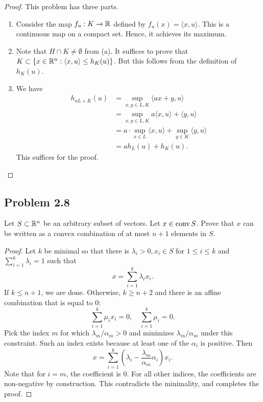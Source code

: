 \documentclass[12pt]{article}
\begin{document}
\begin{proof}
	This problem has three parts. 
	\begin{enumerate}[label = (\alph*)]
		\item Consider the map $ f_u: K \to \mathbb{R}$ defined by $f_u(x) = \langle x, u \rangle$. This is a continuous map on a compact set. Hence, it achieves its maximum. 

		\item Note that $H \cap K \neq \emptyset$ from (a). It suffices to prove that $K \subset \{x \in \mathbb{R}^n : \langle x, u \rangle \leq h_K(u)\}$. But this follows from the definition of $h_K(u)$. 

		\item We have 
		\begin{align*}
			h_{aL+K}(u) & = \sup_{x, y \in L, K} \langle ax + y, u \rangle \\
			&  = \sup_{x, y \in L, K} a \langle x, u \rangle + \langle y, u \rangle \\
			& =  a \cdot \sup_{x \in L} \langle x, u \rangle + \sup_{y \in K} \langle y, u \rangle \\
			& = a h_L(u) + h_K(u). 
		\end{align*}
		This suffices for the proof. 
	\end{enumerate}
\end{proof}

\newpage 

\subsection{Problem 2.8}

\begin{problem}
	Let $S \subset \mathbb{R}^n$ be an arbitrary subset of vectors. Let $x \in \operatorname{conv} S$. Prove that $x$ can be written as a convex combination of at most $n+1$ elements in $S$. 
\end{problem}

\begin{proof}
	Let $k$ be minimal so that there is $\lambda_i > 0, x_i \in S$ for $1 \leq i \leq k$ and $\sum_{i = 1}^k \lambda_i = 1$ such that 
		\[
			x = \sum_{i = 1}^k \lambda_i x_i.
		\]
		If $k \leq n+1$, we are done. Otherwise, $k \geq n+2$ and there is an affine combination that is equal to $0$:
		\[
			\sum_{i = 1}^k \mu_i x_i = 0, \quad \sum_{i = 1}^k \mu_i = 0.
		\]
		Pick the index $m$ for which $\lambda_m / \alpha_m > 0$ and minimizes $\lambda_m / \alpha_m$ under this constraint. Such an index exists because at least one of the $\alpha_i$ is positive. Then 
		\[
			x = \sum_{i = 1}^k \left ( \lambda_i - \frac{\lambda_m}{\alpha_m} \alpha_i \right ) x_i.
		\]
		Note that for $i = m$, the coefficient is $0$. For all other indices, the coefficients are non-negative by construction. This contradicts the minimality, and completes the proof. 
\end{proof}
\end{document}

